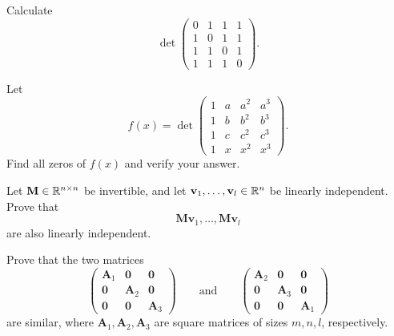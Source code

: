 \documentclass[11pt,oneside]{article}
\begin{document}
\begin{problem}
Calculate
\[
\det
\begin{pmatrix}
0&1&1&1\\
1&0&1&1\\
1&1&0&1\\
1&1&1&0
\end{pmatrix}.
\]
\end{problem}

\begin{problem}
Let
\[
f(x)=
\det
\begin{pmatrix}
1&a&a^2&a^3\\
1&b&b^2&b^3\\
1&c&c^2&c^3\\
1&x&x^2&x^3
\end{pmatrix}.
\]
Find all zeros of $f(x)$ and verify your answer.
\end{problem}

\begin{problem}
Let $\mathbf M\in\mathbb{R}^{n\times n}$ be invertible, and let $\mathbf v_1,\dots,\mathbf v_l\in\mathbb{R}^n$ be linearly independent. Prove that
\[
\mathbf M\mathbf v_1,\dots,\mathbf M\mathbf v_l
\]
are also linearly independent.
\end{problem}

\begin{problem}
Prove that the two matrices
\[
\begin{pmatrix}
\mathbf A_1&\mathbf 0&\mathbf 0\\
\mathbf 0&\mathbf A_2&\mathbf 0\\
\mathbf 0&\mathbf 0&\mathbf A_3
\end{pmatrix}
\qquad\text{and}\qquad
\begin{pmatrix}
\mathbf A_2&\mathbf 0&\mathbf 0\\
\mathbf 0&\mathbf A_3&\mathbf 0\\
\mathbf 0&\mathbf 0&\mathbf A_1
\end{pmatrix}
\]
are similar, where $\mathbf A_1,\mathbf A_2,\mathbf A_3$ are square matrices of sizes $m,n,l$, respectively.
\end{problem}
\end{document}
